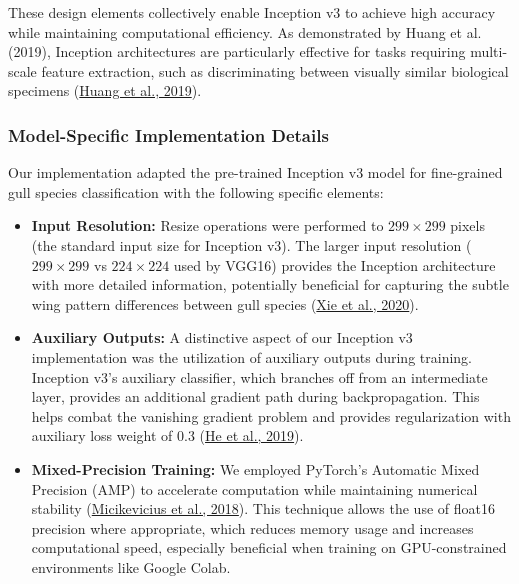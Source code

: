 \documentclass[a4paper,12pt]{report}
\begin{document}
These design elements collectively enable Inception v3 to achieve high accuracy while maintaining computational efficiency. As demonstrated by Huang et al. (2019), Inception architectures are particularly effective for tasks requiring multi-scale feature extraction, such as discriminating between visually similar biological specimens (\href{https://ieeexplore.ieee.org/document/8803812}{Huang et al., 2019}).

\subsubsection{Model-Specific Implementation Details}

Our implementation adapted the pre-trained Inception v3 model for fine-grained gull species classification with the following specific elements:

\begin{itemize}
    \item \textbf{Input Resolution:} Resize operations were performed to $299\times299$ pixels (the standard input size for Inception v3). The larger input resolution ($299\times299$ vs $224\times224$ used by VGG16) provides the Inception architecture with more detailed information, potentially beneficial for capturing the subtle wing pattern differences between gull species (\href{https://arxiv.org/abs/1911.0907}{Xie et al., 2020}).
    
    \item \textbf{Auxiliary Outputs:} A distinctive aspect of our Inception v3 implementation was the utilization of auxiliary outputs during training. Inception v3's auxiliary classifier, which branches off from an intermediate layer, provides an additional gradient path during backpropagation. This helps combat the vanishing gradient problem and provides regularization with auxiliary loss weight of 0.3 (\href{https://arxiv.org/abs/1902.04103}{He et al., 2019}).
    
    \item \textbf{Mixed-Precision Training:} We employed PyTorch's Automatic Mixed Precision (AMP) to accelerate computation while maintaining numerical stability (\href{https://arxiv.org/abs/1710.03740}{Micikevicius et al., 2018}). This technique allows the use of float16 precision where appropriate, which reduces memory usage and increases computational speed, especially beneficial when training on GPU-constrained environments like Google Colab.
\end{itemize}
\end{document}
